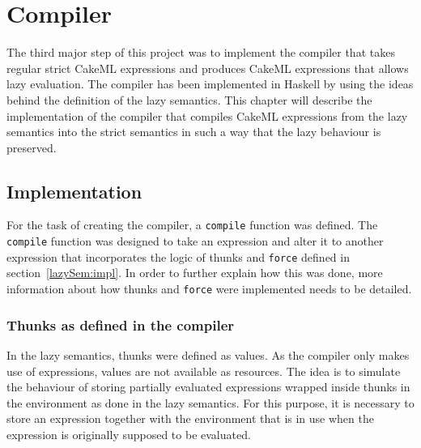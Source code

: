 \chapter{Compiler}
\label{chapter:compiler}
The third major step of this project was to implement the compiler that takes
regular strict CakeML expressions and produces CakeML expressions that allows
lazy evaluation. The compiler has been implemented in Haskell by using the ideas
behind the definition of the lazy semantics. This chapter will describe the
implementation of the compiler that compiles CakeML expressions from the lazy
semantics into the strict semantics in such a way that the lazy behaviour
is preserved.

\section{Implementation}

For the task of creating the compiler, a \texttt{compile} function was defined.
The \texttt{compile} function was designed to take an expression and alter it to
another expression that incorporates the logic of thunks and \texttt{force} defined in
section~\ref{lazySem:impl}. In order to further explain how this was done,
more information about how thunks and \texttt{force} were implemented needs to
be detailed.

\subsection{Thunks as defined in the compiler}
\label{comp:thunk}
In the lazy semantics, thunks were defined as values. As the compiler only makes
use of expressions, values are not available as resources.
The idea is to simulate the behaviour of storing partially evaluated expressions
wrapped inside thunks in the environment as done in the lazy semantics.
For this purpose, it is necessary to store an expression
together with the environment that is in use when the expression is originally
supposed to be evaluated.


